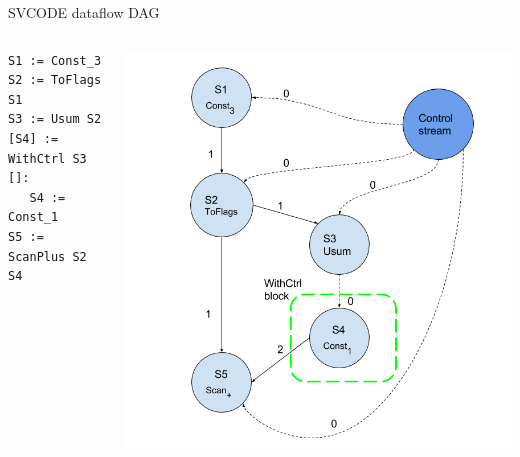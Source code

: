 \documentclass{beamer}
\begin{document}
\begin{frame}[fragile]{SVCODE dataflow DAG}
\begin{columns}
\begin{column}{0.36\textwidth}

\begin{lstlisting}[style=svcode-style]
S1 := Const_3
S2 := ToFlags S1
S3 := Usum S2
[S4] := WithCtrl S3 []:
   S4 := Const_1
S5 := ScanPlus S2 S4
\end{lstlisting}	
	\end{column}	
	\begin{column}{0.64\textwidth}
	\includegraphics[width=1.1\textwidth]{../fig/dataflow.png}
	\end{column}
\end{columns}
\end{frame}
\end{document}
